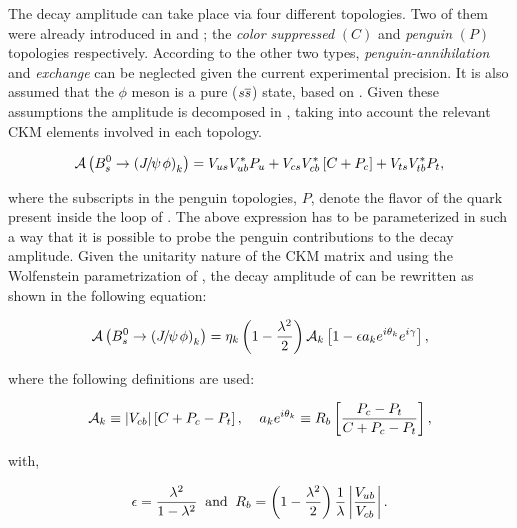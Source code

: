 The \BsJpsiPhi decay amplitude can take place via four different topologies.
Two of them were already introduced in  and ;
the {\it color suppressed }$(C)$ and {\it penguin} $(P)$ topologies respectively.
According to \cite{DeBruyn-thesis} the other two types, {\it penguin-annihilation}
and {\it exchange} can be neglected given the current experimental precision.
It is also assumed that the $\phi$ meson is a pure ($s\overline {s}$) state, based on \cite{Faller:2008gt}.
Given these assumptions the \BsJpsiPhi amplitude is decomposed in ,
taking into account the relevant CKM elements involved in each topology.

\begin{equation}
\mathcal{A} \left( B^0_s\rightarrow \left({J\mskip -3mu/\mskip -2mu\psi\mskip 2mu} \phi\right)_{k} \right) = V_{us}V_{ub}^*P_{u} + V_{cs}V_{cb}^*\left[ C +P_{c} \right] + V_{ts}V_{tb}^*P_{t},
 \label{bsjpsiphi_amp}
\end{equation}

\noindent where the subscripts in the penguin topologies, $P$, denote the flavor of the quark present inside the loop of .
The above expression has to be parameterized in such a way that it is possible to probe the penguin contributions to
the \BsJpsiPhi decay amplitude. Given the unitarity nature of the CKM matrix and using the Wolfenstein parametrization
of , the decay amplitude of  can be rewritten as shown in the following equation:

\begin{equation}
  \mathcal{A} \left( B^0_s\rightarrow \left({J\mskip -3mu/\mskip -2mu\psi\mskip 2mu} \phi\right)_{k} \right) = \eta_k  \left( 1-\frac{\lambda^2}{2} \right) \mathcal{A}_{k} \left[  1 - \epsilon a_k e^{i\theta_k} e^{i\gamma}  \right],
 \label{bsjpsiphi_amp_param}
\end{equation}

\noindent where the following definitions are used:

\begin{equation}
  \mathcal{A}_{k} \equiv |V_{cb}| \left[ C + P_c - P_t \right], \;\;\;\; a_k e^{i\theta_k} \equiv R_b \left[  \frac{P_c - P_t}{C + P_c - P_t}  \right],
  \label{bsjpsiphi_amp_param_defs}
\end{equation}

\noindent with,

\begin{equation}
  \epsilon = \frac{\lambda^2}{1-\lambda^2} \;\;\text{and} \;\;  R_b = \left( 1-\frac{\lambda^2}{2} \right) \frac{1}{\lambda} \left| \frac{V_{ub}}{V_{cb}} \right|.
  \label{bsjpsiphi_amp_param_defs_II}
\end{equation}

